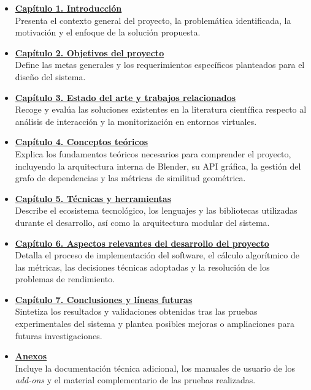\begin{itemize}

\item \hyperref[cap:introduccion]{\textbf{Capítulo 1. Introducción}}\\
Presenta el contexto general del proyecto, la problemática identificada, la motivación y el enfoque de la solución propuesta.

\item \hyperref[cap:objetivos]{\textbf{Capítulo 2. Objetivos del proyecto}}\\
Define las metas generales y los requerimientos específicos planteados para el diseño del sistema.

\item \hyperref[cap:relacionados]{\textbf{Capítulo 3. Estado del arte y trabajos relacionados}}\\
Recoge y evalúa las soluciones existentes en la literatura científica respecto al análisis de interacción y la monitorización en entornos virtuales.

\item \hyperref[cap:conceptos]{\textbf{Capítulo 4. Conceptos teóricos}}\\
Explica los fundamentos teóricos necesarios para comprender el proyecto, incluyendo la arquitectura interna de Blender, su API gráfica, la gestión del grafo de dependencias y las métricas de similitud geométrica.

\item \hyperref[cap:tecnicas]{\textbf{Capítulo 5. Técnicas y herramientas}}\\
Describe el ecosistema tecnológico, los lenguajes y las bibliotecas utilizadas durante el desarrollo, así como la arquitectura modular del sistema.

\item \hyperref[cap:desarrollo]{\textbf{Capítulo 6. Aspectos relevantes del desarrollo del proyecto}}\\
Detalla el proceso de implementación del software, el cálculo algorítmico de las métricas, las decisiones técnicas adoptadas y la resolución de los problemas de rendimiento.

\item \hyperref[cap:conclusiones]{\textbf{Capítulo 7. Conclusiones y líneas futuras}}\\
Sintetiza los resultados y validaciones obtenidas tras las pruebas experimentales del sistema y plantea posibles mejoras o ampliaciones para futuras investigaciones.

\item \hyperref[cap:anexos]{\textbf{Anexos}}\\
Incluye la documentación técnica adicional, los manuales de usuario de los \textit{add-ons} y el material complementario de las pruebas realizadas.

\end{itemize}
